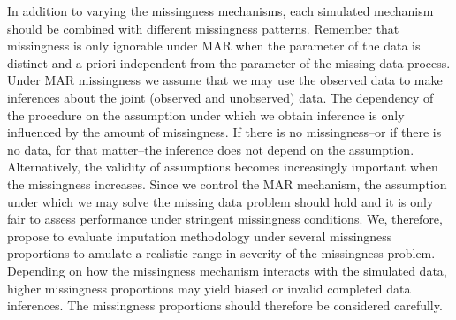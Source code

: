\documentclass[bimj,fleqn]{w-art}
\begin{document}
In addition to varying the missingness mechanisms, each simulated mechanism should be combined with different missingness patterns. Remember that missingness is only ignorable under MAR when the parameter of the data is distinct and a-priori independent from the parameter of the missing data process. Under MAR missingness we assume that we may use the observed data to make inferences about the joint (observed and unobserved) data. The dependency of the procedure on the assumption under which we obtain inference is only influenced by the amount of missingness. If there is no missingness--or if there is no data, for that matter--the inference does not depend on the assumption. Alternatively, the validity of assumptions becomes increasingly important when the missingness increases. Since we control the MAR mechanism, the assumption under which we may solve the missing data problem should hold and it is only fair to assess performance under stringent missingness conditions. We, therefore, propose to evaluate imputation methodology under several missingness proportions to amulate a realistic range in severity of the missingness problem. Depending on how the missingness mechanism interacts with the simulated data, higher missingness proportions may yield biased or invalid completed data inferences. The missingness proportions should therefore be considered carefully.
\end{document}
